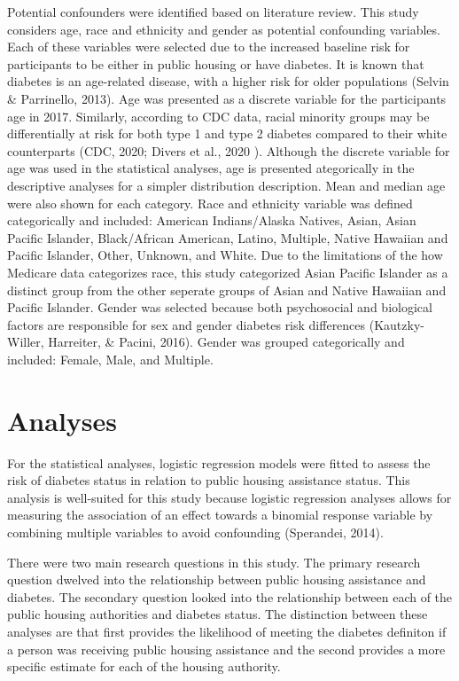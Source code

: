 \documentclass [11pt, proquest] {uwthesis}[2015/03/03]
\begin{document}
Potential confounders were identified based on literature review. This
study considers age, race and ethnicity and gender as potential
confounding variables. Each of these variables were selected due to the
increased baseline risk for participants to be either in public housing
or have diabetes. It is known that diabetes is an age-related disease,
with a higher risk for older populations (Selvin \& Parrinello, 2013).
Age was presented as a discrete variable for the participants age in
2017. Similarly, according to CDC data, racial minority groups may be
differentially at risk for both type 1 and type 2 diabetes compared to
their white counterparts (CDC, 2020; Divers et al., 2020 ). Although the
discrete variable for age was used in the statistical analyses, age is
presented ategorically in the descriptive analyses for a simpler
distribution description. Mean and median age were also shown for each
category. Race and ethnicity variable was defined categorically and
included: American Indians/Alaska Natives, Asian, Asian Pacific
Islander, Black/African American, Latino, Multiple, Native Hawaiian and
Pacific Islander, Other, Unknown, and White. Due to the limitations of
the how Medicare data categorizes race, this study categorized Asian
Pacific Islander as a distinct group from the other seperate groups of
Asian and Native Hawaiian and Pacific Islander. Gender was selected
because both psychosocial and biological factors are responsible for sex
and gender diabetes risk differences (Kautzky-Willer, Harreiter, \&
Pacini, 2016). Gender was grouped categorically and included: Female,
Male, and Multiple.

\section{Analyses}\label{analyses}

For the statistical analyses, logistic regression models were fitted to
assess the risk of diabetes status in relation to public housing
assistance status. This analysis is well-suited for this study because
logistic regression analyses allows for measuring the association of an
effect towards a binomial response variable by combining multiple
variables to avoid confounding (Sperandei, 2014).

There were two main research questions in this study. The primary
research question dwelved into the relationship between public housing
assistance and diabetes. The secondary question looked into the
relationship between each of the public housing authorities and diabetes
status. The distinction between these analyses are that first provides
the likelihood of meeting the diabetes definiton if a person was
receiving public housing assistance and the second provides a more
specific estimate for each of the housing authority.
\end{document}
